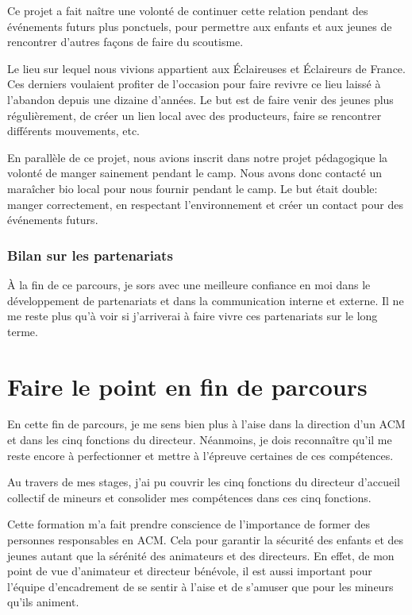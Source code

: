 \documentclass[titlepage,11pt,a4paper]{article}
\begin{document}
Ce projet a fait naître une volonté de continuer cette relation pendant des événements
futurs plus ponctuels, pour permettre aux enfants et aux jeunes de rencontrer d'autres
façons de faire du scoutisme.

Le lieu sur lequel nous vivions appartient aux Éclaireuses et Éclaireurs de France. Ces
derniers voulaient profiter de l'occasion pour faire revivre ce lieu laissé à l'abandon
depuis une dizaine d'années. Le but est de faire venir des jeunes plus régulièrement, de
créer un lien local avec des producteurs, faire se rencontrer différents mouvements, etc.

En parallèle de ce projet, nous avions inscrit dans notre projet pédagogique la volonté de
manger sainement pendant le camp. Nous avons donc contacté un maraîcher bio local pour nous
fournir pendant le camp. Le but était double: manger correctement, en respectant
l'environnement et créer un contact pour des événements futurs.

\subsubsection{Bilan sur les partenariats}

À la fin de ce parcours, je sors avec une meilleure confiance en moi dans le développement
de partenariats et dans la communication interne et externe. Il ne me reste plus qu'à voir
si j'arriverai à faire vivre ces partenariats sur le long terme.

\section{Faire le point en fin de parcours}

En cette fin de parcours, je me sens bien plus à l'aise dans la direction d'un ACM et dans
les cinq fonctions du directeur. Néanmoins, je dois reconnaître qu'il me reste encore à
perfectionner et mettre à l'épreuve certaines de ces compétences.

Au travers de mes stages, j'ai pu couvrir les cinq fonctions du directeur d'accueil
collectif de mineurs et consolider mes compétences dans ces cinq fonctions.

Cette formation m'a fait prendre conscience de l'importance de former des personnes
responsables en ACM\@. Cela pour garantir la sécurité des enfants et des jeunes autant que
la sérénité des animateurs et des directeurs. En effet, de mon point de vue d'animateur et
directeur bénévole, il est aussi important pour l'équipe d'encadrement de se sentir à
l'aise et de s'amuser que pour les mineurs qu'ils animent.
\end{document}
